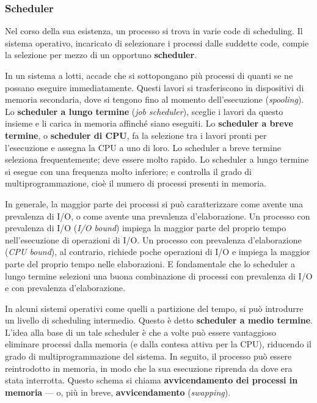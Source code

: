 \documentclass[11pt,a4paper]{article}
\begin{document}
\subsubsection{Scheduler}
Nel corso della sua esistenza, un processo si trova in varie code di scheduling. Il sistema ope­rativo, incaricato di selezionare i processi dalle suddette code, compie la selezione per mez­zo di un opportuno \textbf{scheduler}.

In un sistema a lotti, accade che si sottopongano più processi di quanti se ne
possano eseguire immediatamente. Questi lavori si trasferiscono in dispositivi di memoria
secondaria, dove si tengono fino al momento dell'esecuzione (\emph{spooling}). Lo \textbf{scheduler a lungo termine} (\emph{job scheduler}), sceglie i lavori da questo insieme e li ca­rica in memoria affinché siano eseguiti. Lo \textbf{scheduler a breve termine}, o \textbf{scheduler di CPU},
fa la selezione tra i lavori pronti per l'esecuzione e assegna la CPU a uno di loro.
Lo scheduler a breve termine seleziona frequentemente; deve essere molto rapido.
Lo scheduler a lungo termine si esegue con una frequenza molto inferiore;
e controlla il grado di multiprogrammazione, cioè il numero di
processi presenti in memoria.

In generale, la maggior parte dei processi si può caratterizzare come avente una prevalen­za di I/O, o come avente una prevalenza d'elaborazione. Un processo con prevalenza di I/O
(\emph{I/O bound}) impiega la maggior parte del proprio tempo nell'esecuzione di operazioni di I/O.
Un processo con prevalenza d'elaborazione (\emph{CPU bound}), al contrario, richiede poche opera­zioni di I/O e impiega la maggior parte del proprio tempo nelle elaborazioni. E fondamen­tale che lo scheduler a lungo termine selezioni una buona combinazione di processi con
prevalenza di I/O e con prevalenza d'elaborazione.

In alcuni sistemi operativi come quelli a partizione del tempo, si può introdurre un li­vello di scheduling intermedio. Questo è detto \textbf{scheduler a medio termine}.
L'idea alla base di un tale scheduler è che a volte può essere van­taggioso eliminare processi dalla memoria (e dalla contesa attiva per la CPU), riducendo il
grado di multiprogrammazione del sistema. In seguito, il processo può essere reintrodotto
in memoria, in modo che la sua esecuzione riprenda da dove era stata interrotta.
Questo schema si chiama \textbf{avvicendamento dei processi in memoria} — o, più in breve,
\textbf{avvicendamento} (\emph{swapping}).
\end{document}
